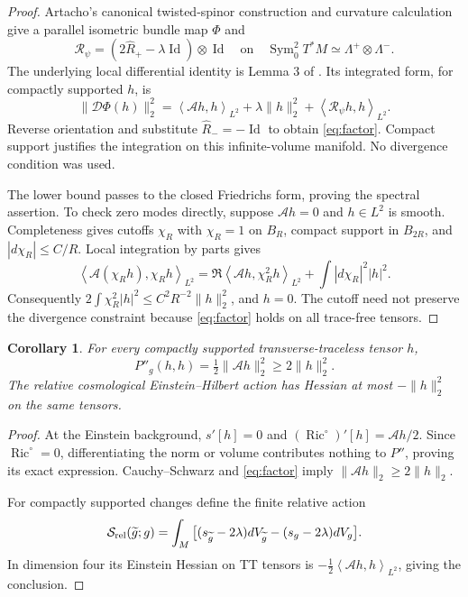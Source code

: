 \documentclass[11pt]{article}
\newtheorem{corollary}[theorem]{Corollary}
\DeclareMathOperator{\Ric}{Ric}
\DeclareMathOperator{\Id}{Id}
\newcommand{\ip}[2]{\left\langle #1,#2\right\rangle}
\begin{document}
\begin{proof}
Artacho's canonical twisted-spinor construction and curvature calculation \cite{Artacho26} give a parallel isometric bundle map $\Phi$ and
\[
 \mathcal R_\psi=(2\widehat R_+-\lambda\Id)\otimes\Id
 \quad\text{on}\quad
 \operatorname{Sym}_0^2T^*M\simeq\Lambda^+\otimes\Lambda^-.
\]
The underlying local differential identity is Lemma 3 of \cite{Artacho25}. Its integrated form, for compactly supported $h$, is
\[
 \|\mathcal D\Phi(h)\|_2^2
 =\ip{\mathcal Ah}{h}_{L^2}
   +\lambda\|h\|_2^2+\ip{\mathcal R_\psi h}{h}_{L^2}.
\]
Reverse orientation and substitute $\widehat R_-=-\Id$ to obtain \eqref{eq:factor}. Compact support justifies the integration on this infinite-volume manifold. No divergence condition was used.

The lower bound passes to the closed Friedrichs form, proving the spectral assertion. To check zero modes directly, suppose $\mathcal Ah=0$ and $h\in L^2$ is smooth. Completeness gives cutoffs $\chi_R$ with $\chi_R=1$ on $B_R$, compact support in $B_{2R}$, and $|d\chi_R|\le C/R$. Local integration by parts gives
\[
 \ip{\mathcal A(\chi_Rh)}{\chi_Rh}_{L^2}
 =\Re\ip{\mathcal Ah}{\chi_R^2h}_{L^2}
  +\int|d\chi_R|^2|h|^2.
\]
Consequently $2\int\chi_R^2|h|^2\le C^2R^{-2}\|h\|_2^2$, and $h=0$. The cutoff need not preserve the divergence constraint because \eqref{eq:factor} holds on all trace-free tensors.
\end{proof}

\begin{corollary}\label{cor:Hess}
For every compactly supported transverse-traceless tensor $h$,
\begin{equation}\label{eq:Phess}
 P''_g(h,h)=\tfrac12\|\mathcal Ah\|_2^2\ge2\|h\|_2^2.
\end{equation}
The relative cosmological Einstein--Hilbert action has Hessian at most $-\|h\|_2^2$ on the same tensors.
\end{corollary}
\begin{proof}
At the Einstein background, $s'[h]=0$ and $(\Ric^\circ)'[h]=\mathcal Ah/2$. Since $\Ric^\circ=0$, differentiating the norm or volume contributes nothing to $P''$, proving its exact expression. Cauchy--Schwarz and \eqref{eq:factor} imply $\|\mathcal Ah\|_2\ge2\|h\|_2$.

For compactly supported changes define the finite relative action
\[
 \mathcal S_{\rm rel}(\widetilde g;g)
 =\int_M\big[(s_{\widetilde g}-2\lambda)dV_{\widetilde g}
                  -(s_g-2\lambda)dV_g\big].
\]
In dimension four its Einstein Hessian on TT tensors is
$-\tfrac12\ip{\mathcal Ah}{h}_{L^2}$, giving the conclusion.
\end{proof}
\end{document}
